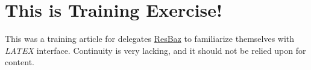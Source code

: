 \section{This is Training Exercise!}
This was a training article for delegates \href{http://melbourne.resbaz.edu.au/}{ResBaz} to familiarize themselves with \textit{LATEX} interface. 
Continuity is very lacking, and it should not be relied upon for content. 